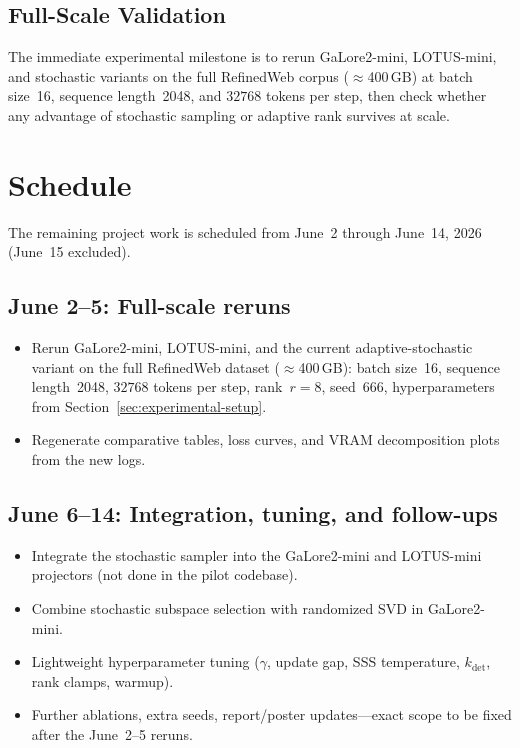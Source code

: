 \documentclass[conference]{IEEEtran}
\begin{document}
\subsection{Full-Scale Validation}
The immediate experimental milestone is to rerun GaLore2-mini, LOTUS-mini, and stochastic variants on the full RefinedWeb corpus ($\approx$400\,GB) at batch size~16, sequence length~2048, and $32768$ tokens per step, then check whether any advantage of stochastic sampling or adaptive rank survives at scale.

\section{Schedule}

The remaining project work is scheduled from June~2 through June~14, 2026 (June~15 excluded).

\subsection{June 2--5: Full-scale reruns}
\begin{itemize}
    \item Rerun GaLore2-mini, LOTUS-mini, and the current adaptive-stochastic variant on the full RefinedWeb dataset ($\approx$400\,GB): batch size~16, sequence length~2048, $32768$ tokens per step, rank~$r=8$, seed~666, hyperparameters from Section~\ref{sec:experimental-setup}.
    \item Regenerate comparative tables, loss curves, and VRAM decomposition plots from the new logs.
\end{itemize}

\subsection{June 6--14: Integration, tuning, and follow-ups}
\begin{itemize}
    \item Integrate the stochastic sampler into the GaLore2-mini and LOTUS-mini projectors (not done in the pilot codebase).
    \item Combine stochastic subspace selection with randomized SVD in GaLore2-mini.
    \item Lightweight hyperparameter tuning ($\gamma$, update gap, SSS temperature, $k_{\text{det}}$, rank clamps, warmup).
    \item Further ablations, extra seeds, report/poster updates---exact scope to be fixed after the June~2--5 reruns.
\end{itemize}
\end{document}
